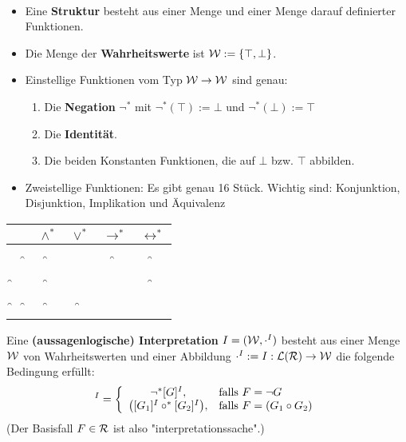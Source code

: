 \begin{definition}\
	\begin{itemize}
		\item Eine \textbf{Struktur} besteht aus einer Menge und einer Menge darauf definierter Funktionen.
		\item Die Menge der \textbf{Wahrheitswerte} ist $\mathcal{W}:=\lbrace\top,\bot\rbrace$.
		\item Einstellige Funktionen vom Typ $\mathcal{W}\to\mathcal{W}$ sind genau:
		\begin{enumerate}
			\item Die \textbf{Negation} $\neg^\ast$ mit $\neg^\ast(\top):=\bot$ und $\neg^\ast(\bot):=\top$
			\item Die \textbf{Identität}.
			\item Die beiden Konstanten Funktionen, die auf $\bot$ bzw. $\top$ abbilden.
		\end{enumerate}
		\item Zweistellige Funktionen: Es gibt genau 16 Stück. Wichtig sind:
			Konjunktion, Disjunktion, Implikation und Äquivalenz
	\end{itemize}
	
	\begin{tabular}{cc||c|c|c|c}\\
		&& $\wedge^\ast$ & $\vee^\ast$ & $\to^\ast$ & $\leftrightarrow^\ast$\\ \hline
		\w & \w & \w & \w & \w & \w\\
		\w & \f & \f & \w & \f & \f\\
		\f & \w & \f & \w & \w & \f\\
		\f & \f & \f & \f & \w & \w
	\end{tabular}
\end{definition}

\begin{definition}\label{def3.9}
	Eine \textbf{(aussagenlogische) Interpretation} $I=(\mathcal{W},\cdot^I)$ besteht aus einer Menge $\mathcal{W}$ von Wahrheitswerten und einer Abbildung $\cdot^I:=I:\mathcal{L}(\mathcal{R})\to\mathcal{W}$ die folgende Bedingung erfüllt:
	\begin{align*}
		[F]^I=\left\lbrace\begin{array}{cl}
			\neg^\ast[G]^I, &\falls F=\neg G\\
			\big([G_1]^I\circ^\ast[G_2]^I\big),&\falls F=(G_1\circ G_2)
		\end{array}\right.
	\end{align*}
	(Der Basisfall $F\in\mathcal{R}$ ist also "interpretationssache".)
\end{definition}

